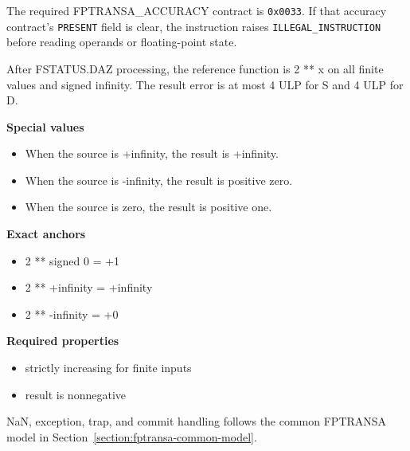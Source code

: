 The required FPTRANSA\_ACCURACY contract is \texttt{0x0033}. If that accuracy contract's \texttt{PRESENT} field is clear, the instruction raises \texttt{ILLEGAL\_INSTRUCTION} before reading operands or floating-point state.

After FSTATUS.DAZ processing, the reference function is 2 ** x on all finite values and signed infinity. The result error is at most 4 ULP for S and 4 ULP for D.

\textbf{Special values}\par
\begin{itemize}
\item When the source is +infinity, the result is +infinity.
\item When the source is -infinity, the result is positive zero.
\item When the source is zero, the result is positive one.
\end{itemize}

\textbf{Exact anchors}\par
\begin{itemize}
\item 2 ** signed 0 = +1
\item 2 ** +infinity = +infinity
\item 2 ** -infinity = +0
\end{itemize}

\textbf{Required properties}\par
\begin{itemize}
\item strictly increasing for finite inputs
\item result is nonnegative
\end{itemize}

NaN, exception, trap, and commit handling follows the common FPTRANSA model in Section~\ref{section:fptransa-common-model}.
